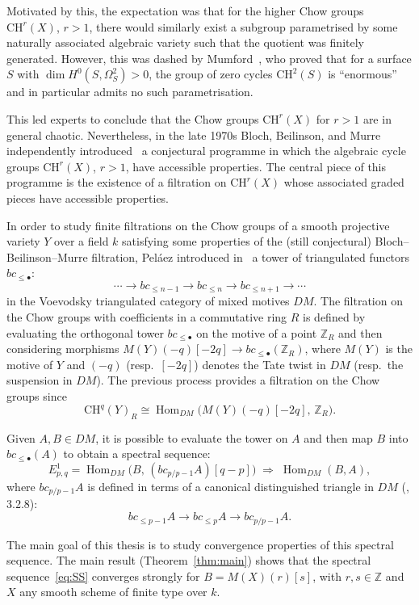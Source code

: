 \documentclass[12pt,a4paper]{article}
\theoremstyle{definition}
\newcommand{\Hom}{\operatorname{Hom}}
\newcommand{\CH}{\mathrm{CH}}
\newcommand{\Z}{\mathbb{Z}}
\begin{document}
Motivated by this, the expectation was that for the higher Chow groups $\CH^r(X)$,
$r>1$, there would similarly exist a subgroup parametrised by some naturally associated
algebraic variety such that the quotient was finitely generated.  However, this was
dashed by Mumford~\cite{Mum69}, who proved that for a surface $S$ with
$\dim H^0(S,\Omega_S^2)>0$, the group of zero cycles $\CH^2(S)$ is ``enormous'' and
in particular admits no such parametrisation.

This led experts to conclude that the Chow groups $\CH^r(X)$ for $r>1$ are in
general chaotic.  Nevertheless, in the late 1970s Bloch, Beilinson, and Murre
independently introduced~\cite{Blo80,Bei87,Mur93} a conjectural programme in which the
algebraic cycle groups $\CH^r(X)$, $r>1$, have accessible properties.  The central
piece of this programme is the existence of a filtration on $\CH^r(X)$ whose
associated graded pieces have accessible properties.

In order to study finite filtrations on the Chow groups of a smooth projective variety
$Y$ over a field $k$ satisfying some properties of the (still conjectural)
Bloch–Beilinson–Murre filtration, Peláez introduced in~\cite{Pel14} a tower of
triangulated functors $bc_{\leq\bullet}$:
\[
  \cdots \to bc_{\leq n-1} \to bc_{\leq n} \to bc_{\leq n+1} \to \cdots
\]
in the Voevodsky triangulated category of mixed motives $DM$.  The filtration on the
Chow groups with coefficients in a commutative ring $R$ is defined by evaluating the
orthogonal tower $bc_{\leq\bullet}$ on the motive of a point $\Z_R$ and then
considering morphisms $M(Y)(-q)[-2q] \to bc_{\leq\bullet}(\Z_R)$, where $M(Y)$ is
the motive of $Y$ and $(-q)$ (resp.\ $[-2q]$) denotes the Tate twist in $DM$
(resp.\ the suspension in $DM$).  The previous process provides a filtration on the
Chow groups since
\[
  \CH^q(Y)_R \cong \Hom_{DM}\!\bigl(M(Y)(-q)[-2q],\,\Z_R\bigr).
\]

Given $A, B \in DM$, it is possible to evaluate the tower on $A$ and then map $B$
into $bc_{\leq\bullet}(A)$ to obtain a spectral sequence:
\begin{equation}\label{eq:SS}
  E^1_{p,q} = \Hom_{DM}\!\bigl(B,\,(bc_{p/p-1}A)[q-p]\bigr)
  \;\Rightarrow\; \Hom_{DM}(B,A),
\end{equation}
where $bc_{p/p-1}A$ is defined in terms of a canonical distinguished triangle in
$DM$ (\cite{Pel17}, 3.2.8):
\[
  bc_{\leq p-1}A \to bc_{\leq p}A \to bc_{p/p-1}A.
\]

The main goal of this thesis is to study convergence properties of this spectral
sequence.  The main result (Theorem~\ref{thm:main}) shows that the spectral
sequence~\eqref{eq:SS} converges strongly for $B = M(X)(r)[s]$, with $r,s\in\Z$
and $X$ any smooth scheme of finite type over $k$.
\end{document}
